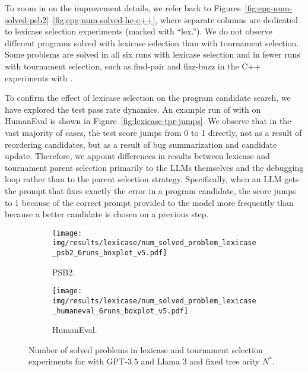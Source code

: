 To zoom in on the improvement details, we refer back to Figures~\ref{fig:epg-num-solved-psb2}--\ref{fig:epg-num-solved-he-c++}, where separate columns are dedicated to lexicase selection experiments (marked with ``lex.'').
We do not observe different programs solved with lexicase selection than with tournament selection. 
Some problems are solved in all six runs with lexicase selection and in fewer runs with tournament selection, such as find-pair and fizz-buzz in the C++ experiments with \gpt{}.

To confirm the effect of lexicase selection on the program candidate search, we have explored the test pass rate dynamics.
An example run of \method{} with \gpt{} on HumanEval is shown in Figure~\ref{fig:lexicase-tpr-jumps}.
We observe that in the vast majority of cases, the test score jumps from 0 to 1 directly, not as a result of reordering candidates, but as a result of \method{}  bug summarization and candidate update.
Therefore, we appoint differences in results between lexicase and tournament parent selection primarily to the LLMs themselves and the debugging loop rather than to the parent selection strategy. 
Specifically, when an LLM gets the prompt that fixes exactly the error in a program candidate, the score jumps to 1 because of the correct prompt provided to the model more frequently than because a better candidate is chosen on a previous step.






\begin{figure}[bt]
\begin{subfigure}{.45\linewidth}
\centering
\texttt{[image: img/results/lexicase/num\_solved\_problem\_lexicase\_psb2\_6runs\_boxplot\_v5.pdf]}
  \caption{PSB2.}
  \label{fig:num-solved-lexicase-selection-psb2}
\end{subfigure}
\begin{subfigure}{.45\linewidth}
\centering
\texttt{[image: img/results/lexicase/num\_solved\_problem\_lexicase\_humaneval\_6runs\_boxplot\_v5.pdf]}
  \caption{HumanEval.}
  \label{fig:num-solved-lexicase-selection-he}
\end{subfigure}
\caption{Number of solved problems in lexicase and tournament selection experiments for \method{} with GPT-3.5 and Llama 3 and fixed tree arity $N^*$.}
\label{fig:num-solved-lexicase-selection}
\end{figure}


